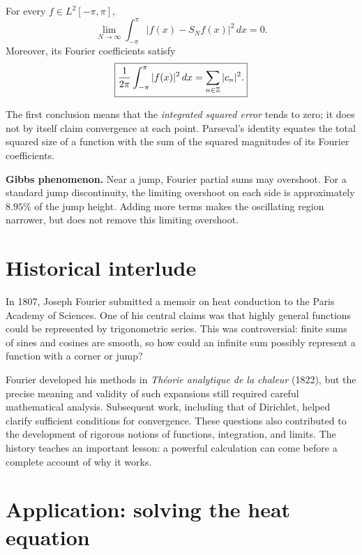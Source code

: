 \begin{theorem}
For every $f\in L^2[-\pi,\pi]$,
\begin{equation}\label{eq:l2-convergence}
 \lim_{N\to\infty}\int_{-\pi}^{\pi}|f(x)-S_Nf(x)|^2\,dx=0.
\end{equation}
Moreover, its Fourier coefficients satisfy
\begin{equation}\label{eq:parseval}
 \boxed{\frac1{2\pi}\int_{-\pi}^{\pi}|f(x)|^2\,dx
 =\sum_{n\in\mathbb{Z}}|c_n|^2.}
\end{equation}
\end{theorem}
The first conclusion means that the \emph{integrated squared error}
tends to zero; it does not by itself claim convergence at each point.
Parseval's identity equates the total squared size of a function with the sum
of the squared magnitudes of its Fourier coefficients.

\begin{remark}
\textbf{Gibbs phenomenon.} Near a jump, Fourier partial sums may overshoot.
For a standard jump discontinuity, the limiting overshoot on each side is
approximately $8.95\%$ of the jump height. Adding more terms makes the
oscillating region narrower, but does not remove this limiting overshoot.
\end{remark}

\section{Historical interlude}
In 1807, Joseph Fourier submitted a memoir on heat conduction to the Paris
Academy of Sciences. One of his central claims was that highly general
functions could be represented by trigonometric series. This was controversial:
finite sums of sines and cosines are smooth, so how could an infinite sum
possibly represent a function with a corner or jump?

Fourier developed his methods in \emph{Th\'eorie analytique de la chaleur}
(1822), but the precise meaning and validity of such expansions still required
careful mathematical analysis. Subsequent work, including that of Dirichlet,
helped clarify sufficient conditions for convergence. These questions also
contributed to the development of rigorous notions of functions, integration,
and limits. The history teaches an important lesson: a powerful calculation can
come before a complete account of why it works.

\section{Application: solving the heat equation}\label{sec:heat}
